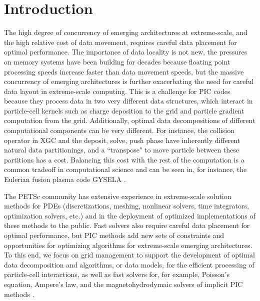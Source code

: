 \documentclass[review]{siamart}
\begin{document}
\section{Introduction}

The high degree of concurrency of emerging architectures at extreme-scale, and the high relative cost of data movement, requires careful data placement for optimal performance.
The importance of data locality is not new, the pressures on memory systems have been building for decades because floating point processing speeds increase faster than data movement speeds, but the massive concurrency of emerging architectures is further exacerbating the need for careful data layout in extreme-scale computing.
This is a challenge for PIC codes because they process data in two very different data structures, which interact in particle-cell kernels such as charge deposition to the grid and particle gradient computation from the grid.
Additionally, optimal data decompositions of different computational components can be very different.
For instance, the collision operator in XGC and the deposit, solve, push phase have inherently different natural data partitionings, and a ``transpose" to move particle between these partitions has a cost.
Balancing this cost with the rest of the computation is a common tradeoff in computational science and can be seen in, for instance, the Eulerian fusion plasma code GYSELA \cite{Bigot13}.

The PETSc community has extensive experience in extreme-scale solution methods for PDEs (discretizations, meshing, nonlinear solvers, time integrators, optimization solvers, etc.) and in the deployment of optimized implementations of these methods to the public.
Fast solvers also require careful data placement for optimal performance, but PIC methods add new sets of constraints and opportunities for optimizing algorithms for extreme-scale emerging architectures.
To this end, we focus on grid management to support the development of optimal data decomposition and algorithms, or data models,  for the efficient processing of particle-cell interactions, as well as fast solvers for, for example, Poisson's equation, Ampere's law, and the magnetohydrodymaic  solvers of implicit PIC methods \cite{DBLP:journals/cphysics/ChenC15,Adams-10a}.
\end{document}
